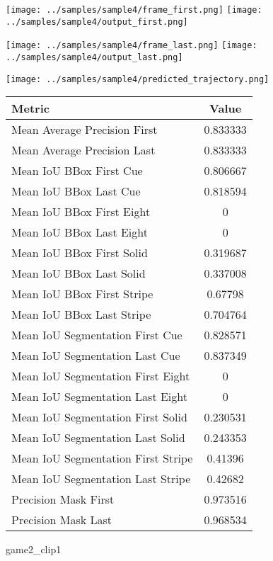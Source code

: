 \begin{figure}
\texttt{[image: ../samples/sample4/frame\_first.png]}
\texttt{[image: ../samples/sample4/output\_first.png]}\par
\texttt{[image: ../samples/sample4/frame\_last.png]}
\texttt{[image: ../samples/sample4/output\_last.png]}\par
\centering
\texttt{[image: ../samples/sample4/predicted\_trajectory.png]}
\caption{game2\_clip1}
\vspace{10pt}
\begin{tabular}{|l|c|}
\hline
\textbf{Metric} & \textbf{Value} \\
\hline
Mean Average Precision First & 0.833333 \\
Mean Average Precision Last & 0.833333 \\
\hline
Mean IoU BBox First Cue & 0.806667 \\
Mean IoU BBox Last Cue & 0.818594 \\
Mean IoU BBox First Eight & 0 \\
Mean IoU BBox Last Eight & 0 \\
Mean IoU BBox First Solid & 0.319687 \\
Mean IoU BBox Last Solid & 0.337008 \\
Mean IoU BBox First Stripe & 0.67798 \\
Mean IoU BBox Last Stripe & 0.704764 \\
\hline
Mean IoU Segmentation First Cue & 0.828571 \\
Mean IoU Segmentation Last Cue & 0.837349 \\
Mean IoU Segmentation First Eight & 0 \\
Mean IoU Segmentation Last Eight & 0 \\
Mean IoU Segmentation First Solid & 0.230531 \\
Mean IoU Segmentation Last Solid & 0.243353 \\
Mean IoU Segmentation First Stripe & 0.41396 \\
Mean IoU Segmentation Last Stripe & 0.42682 \\
\hline
Precision Mask First & 0.973516 \\
Precision Mask Last & 0.968534 \\
\hline
\end{tabular}
\end{figure}

